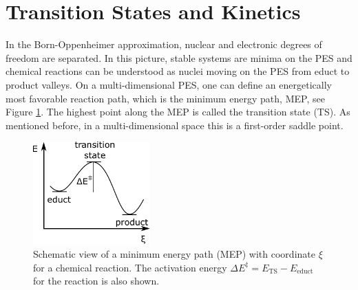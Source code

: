 \documentclass[11pt,DIV=13,BCOR=5mm,a4paper,headinclude]{scrbook}
\begin{document}
\section{Transition States and Kinetics}\label{sec:tst}
In the Born-Oppenheimer approximation\cite{bornoppenheimer}, nuclear and electronic degrees of freedom are separated.
In this picture, stable systems are minima on the PES and chemical reactions can be understood as nuclei moving on the PES from educt to product valleys.
On a multi-dimensional PES, one can define an energetically most favorable reaction path, which is the minimum energy path, MEP, see Figure \ref{abb:mep}.
The highest point along the MEP is called the transition state (TS).
As mentioned before, in a multi-dimensional space this is a first-order saddle point.
\begin{figure}[!h]
\centering
 \includegraphics[width=0.4\textwidth]{figures/theory/MEP.pdf}
   \caption{Schematic view of a minimum energy path (MEP) with coordinate $\xi$ for a chemical reaction.
The activation energy $\Delta E^\ddagger= E_\textrm{TS}- E_\textrm{educt}$ for the reaction is also shown.}
            \label{abb:mep}
\end{figure}
\end{document}
